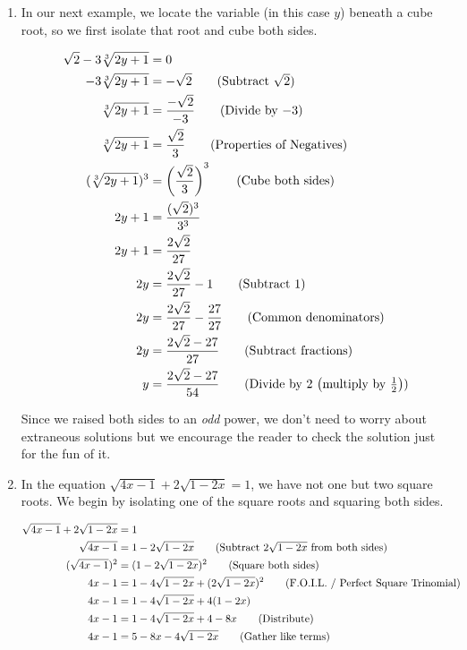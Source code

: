 \begin{ex}
\begin{enumerate}
\item  In our next example, we locate the variable (in this case $y$) beneath a cube root, so we first isolate that root and cube both sides.

\begin{align*}
\sqrt{2} - 3\sqrt[3]{2y+1} &  =  0 \\
- 3\sqrt[3]{2y+1} &  =  - \sqrt{2} \tag{Subtract $\sqrt{2}$} \\
\sqrt[3]{2y+1} & = \dfrac{-\sqrt{2}}{-3} \tag{Divide by $-3$} \\
\sqrt[3]{2y+1} & = \dfrac{\sqrt{2}}{3}  \tag{Properties of Negatives} \\
(\sqrt[3]{2y+1})^3 & = \left( \dfrac{\sqrt{2}}{3} \right)^{3} \tag{Cube both sides} \\
2y + 1 & = \dfrac{(\sqrt{2})^3}{3^3} \\
2y + 1 & = \dfrac{2\sqrt{2}}{27} \\ 
2y  & = \dfrac{2 \sqrt{2}}{27}  - 1 \tag{Subtract $1$} \\
2y  & = \dfrac{2 \sqrt{2}}{27}  - \dfrac{27}{27} \tag{Common denominators} \\ 
2y  & = \dfrac{2 \sqrt{2} - 27}{27} \tag{Subtract fractions} \\
y  & = \dfrac{2 \sqrt{2} - 27}{54} \tag{Divide by $2$ $\left(\text{multiply by $\frac{1}{2}$} \right)$} \\
\end{align*}

Since we raised both sides to an \textit{odd} power, we don't need to worry about extraneous solutions but we encourage the reader to check the solution just for the fun of it.

\item In the equation $\sqrt{4x-1}  + 2\sqrt{1 - 2x} = 1$, we have not one but two square roots.  We begin by isolating one of the square roots and squaring both sides.

\begin{align*}
\sqrt{4x-1}  + 2\sqrt{1 - 2x} & = 1 \\ 
\sqrt{4x-1} & = 1 - 2\sqrt{1-2x} \tag{Subtract $2\sqrt{1 - 2x}$ from both sides} \\
(\sqrt{4x-1})^2 & = (1 - 2\sqrt{1-2x})^2 \tag{Square both sides} \\
4x - 1 & = 1 - 4\sqrt{1-2x} + (2\sqrt{1-2x})^2 \tag{F.O.I.L. / Perfect Square Trinomial} \\
4x - 1 & = 1 - 4\sqrt{1-2x} + 4(1-2x) & \\
4x - 1 & = 1 - 4\sqrt{1-2x} + 4 - 8x \tag{Distribute} \\ 
4x - 1 & = 5 - 8x - 4\sqrt{1-2x} \tag{Gather like terms} \\
\end{align*}


\end{enumerate}
\end{ex}
